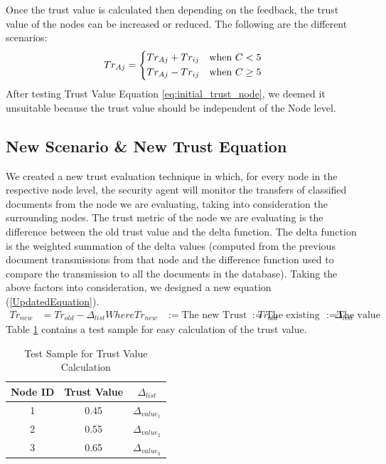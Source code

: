 Once the trust value is calculated then depending on the feedback, the trust
value of the nodes can be increased or reduced. The following are the different
scenarios: 
\begin{equation}
   Tr_{Aj} =    \begin{dcases*}
                    Tr_{Aj} + Tr_{ij} & when $C < 5$\\
                    Tr_{Aj} - Tr_{ij} & when $C \ge 5$
                \end{dcases*}
                \label{eq:initial_trust_node}
\end{equation}
After testing Trust Value Equation \ref{eq:initial_trust_node}, we deemed it unsuitable because the trust value should be independent of the Node level. 


\subsection{New Scenario \& New Trust Equation}
We created a new trust evaluation technique in which, for every node in the
respective node level, the security agent will monitor the transfers of
classified documents from the node we are evaluating, taking into consideration
the surrounding nodes. The trust metric of the node we are evaluating is the
difference between the old trust value and the delta function. The delta
function is the weighted summation of the delta values (computed from the
previous document transmissions from that node and the difference function used to
compare the transmission to all the documents in the database).  Taking the
above factors into consideration, we designed a new equation
(\ref{UpdatedEquation}).
\begin{equation}
    \label{UpdatedEquation}
    \begin{align}
        Tr_{new} &= Tr_{old} - \Delta_{list}
        Where Tr_{new} &:= \text{The new Trust value of the employee}
        Tr_{old} &:= \text{The existing trust value}
        \Delta_{list} &:= \text{The value obtained by combining input from the
        difference function and classification}
    \end{align}
\end{equation}
Table \ref{tab:trust_value_calculation} contains a test sample for easy calculation of the trust value.

\begin{table}[h!]
    \centering
    \begin{tabular}{c | c | c}
        \hline 
        Node ID & Trust Value & \(\Delta_{list}\) \\
        \hline \hline
        1 & 0.45 & \(\Delta_{value_1}\) \\
        2 & 0.55 & \(\Delta_{value_2}\) \\
        3 & 0.65 & \(\Delta_{value_3}\) \\
    \end{tabular}
    \caption{Test Sample for Trust Value Calculation}
    \label{tab:trust_value_calculation}
\end{table}

